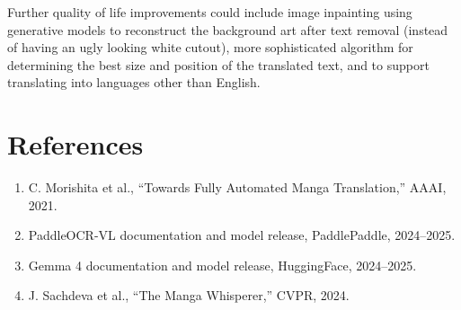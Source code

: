 \documentclass[10pt]{article}
\begin{document}
Further quality of life improvements could include image inpainting using generative models to reconstruct the background art after text removal (instead of having an ugly looking white cutout), more sophisticated algorithm for determining the best size and position of the translated text, and to support translating into languages other than English.

\section*{References}
\begin{enumerate}[leftmargin=1.5em,itemsep=0pt,topsep=2pt]
    \item C. Morishita et al., ``Towards Fully Automated Manga Translation,'' AAAI, 2021.
    \item PaddleOCR-VL documentation and model release, PaddlePaddle, 2024--2025.
    \item Gemma 4 documentation and model release, HuggingFace, 2024--2025.
    \item J. Sachdeva et al., ``The Manga Whisperer,'' CVPR, 2024.
\end{enumerate}
\end{document}
